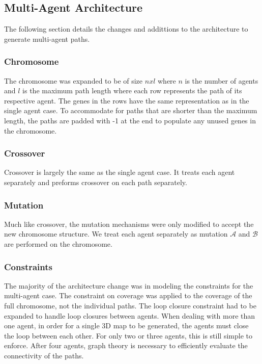\documentclass[letterpaper, 10 pt, conference]{ieeeconf}  %
\begin{document}
\subsection{Multi-Agent Architecture}

The following section details the changes and addittions to the architecture to generate multi-agent paths.

\subsubsection{Chromosome}
The chromosome was expanded to be of size $nxl$ where $n$ is the number of agents and $l$ is the maximum path length where each row represents the path of its respective agent. The genes in the rows have the same representation as in the single agent case. To accommodate for paths that are shorter than the maximum length, the paths are padded with -1 at the end to populate any unused genes in the chromosome.

\subsubsection{Crossover}
Crossover is largely the same as the single agent case. It treats each agent separately and preforms crossover on each path separately.

\subsubsection{Mutation}
Much like crossover, the mutation mechanisms were only modified to accept the new chromosome structure. We treat each agent separately as mutation $\mathcal{A}$ and $\mathcal{B}$ are performed on the chromosome.

\subsubsection{Constraints}
The majority of the architecture change was in modeling the constraints for the multi-agent case. The constraint on coverage was applied to the coverage of the full chromosome, not the individual paths. The loop closure constraint had to be expanded to handle loop closures between agents. When dealing with more than one agent, in order for a single 3D map to be generated, the agents must close the loop between each other. For only two or three agents, this is still simple to enforce. After four agents, graph theory is necessary to efficiently evaluate the connectivity of the paths.
\end{document}
